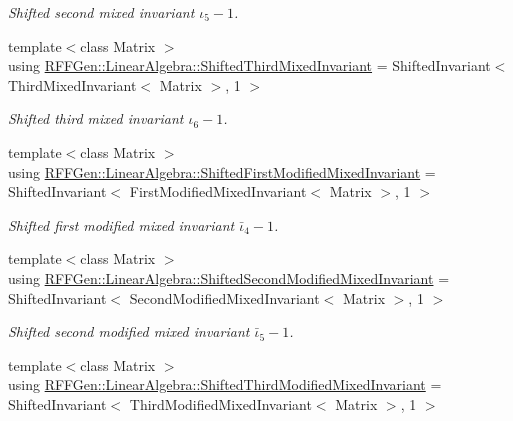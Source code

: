 \begin{DoxyCompactItemize}
\begin{DoxyCompactList}\small\item\em Shifted second mixed invariant $ \iota_5 - 1 $. \end{DoxyCompactList}\item 
\hypertarget{group__InvariantGroup_ga5923cfb191178d5edacef49c687462ae}{{\footnotesize template$<$class Matrix $>$ }\\using \hyperlink{group__InvariantGroup_ga5923cfb191178d5edacef49c687462ae}{R\-F\-F\-Gen\-::\-Linear\-Algebra\-::\-Shifted\-Third\-Mixed\-Invariant} = Shifted\-Invariant$<$ Third\-Mixed\-Invariant$<$ Matrix $>$, 1 $>$}\label{group__InvariantGroup_ga5923cfb191178d5edacef49c687462ae}

\begin{DoxyCompactList}\small\item\em Shifted third mixed invariant $ \iota_6 - 1 $. \end{DoxyCompactList}\item 
\hypertarget{group__InvariantGroup_ga55cd39bf5ba0bab6af5f0a1d26a040e4}{{\footnotesize template$<$class Matrix $>$ }\\using \hyperlink{group__InvariantGroup_ga55cd39bf5ba0bab6af5f0a1d26a040e4}{R\-F\-F\-Gen\-::\-Linear\-Algebra\-::\-Shifted\-First\-Modified\-Mixed\-Invariant} = Shifted\-Invariant$<$ First\-Modified\-Mixed\-Invariant$<$ Matrix $>$, 1 $>$}\label{group__InvariantGroup_ga55cd39bf5ba0bab6af5f0a1d26a040e4}

\begin{DoxyCompactList}\small\item\em Shifted first modified mixed invariant $ \bar\iota_4 - 1 $. \end{DoxyCompactList}\item 
\hypertarget{group__InvariantGroup_ga9934f120b3c3db724c2216d2aca90cd1}{{\footnotesize template$<$class Matrix $>$ }\\using \hyperlink{group__InvariantGroup_ga9934f120b3c3db724c2216d2aca90cd1}{R\-F\-F\-Gen\-::\-Linear\-Algebra\-::\-Shifted\-Second\-Modified\-Mixed\-Invariant} = Shifted\-Invariant$<$ Second\-Modified\-Mixed\-Invariant$<$ Matrix $>$, 1 $>$}\label{group__InvariantGroup_ga9934f120b3c3db724c2216d2aca90cd1}

\begin{DoxyCompactList}\small\item\em Shifted second modified mixed invariant $ \bar\iota_5 - 1 $. \end{DoxyCompactList}\item 
\hypertarget{group__InvariantGroup_ga5b8725e66f697bd26179ea888e75a84e}{{\footnotesize template$<$class Matrix $>$ }\\using \hyperlink{group__InvariantGroup_ga5b8725e66f697bd26179ea888e75a84e}{R\-F\-F\-Gen\-::\-Linear\-Algebra\-::\-Shifted\-Third\-Modified\-Mixed\-Invariant} = Shifted\-Invariant$<$ Third\-Modified\-Mixed\-Invariant$<$ Matrix $>$, 1 $>$}\label{group__InvariantGroup_ga5b8725e66f697bd26179ea888e75a84e}


\end{DoxyCompactItemize}
